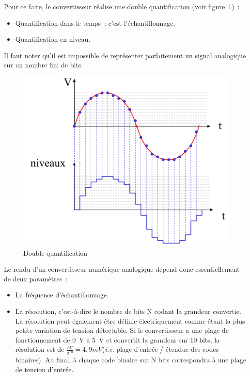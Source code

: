 \documentclass[11pt,a4paper]{article}
\theoremstyle{definition}%
\begin{document}
Pour ce faire, le convertisseur réalise une double quantification (voir figure~\ref{fig:double-quant})~:
\begin{itemize}
	\item Quantification dans le temps~: c’est l’échantillonnage.
	\item Quantification en niveau.
\end{itemize}
Il faut noter qu’il est impossible de représenter parfaitement un signal analogique sur un nombre fini de bits.


\begin{figure}[H]
	\centering
	\includegraphics[width=.7\textwidth]{double-quant}
	\caption{Double quantification}
	\label{fig:double-quant}
\end{figure}

Le rendu d’un convertisseur numérique-analogique dépend donc essentiellement de deux paramètres~:
\begin{itemize}
	\item La fréquence d’échantillonnage.
	\item La résolution, c’est-à-dire le nombre de bits N codant la grandeur convertie.
	La résolution peut également être définie électriquement comme étant la plus petite variation de tension détectable.
	Si le convertisseur a une plage de fonctionnement de 0~V à 5~V et convertit la grandeur sur 10 bits, la résolution est de $\frac{5 V}{2^{10}} = 4,9 mV$(\textit{i.e.} plage d’entrée / étendue des codes binaires).
	Au final, à chaque code binaire sur N bits correspondra à une plage de tension d’entrée.
\end{itemize}
\end{document}
